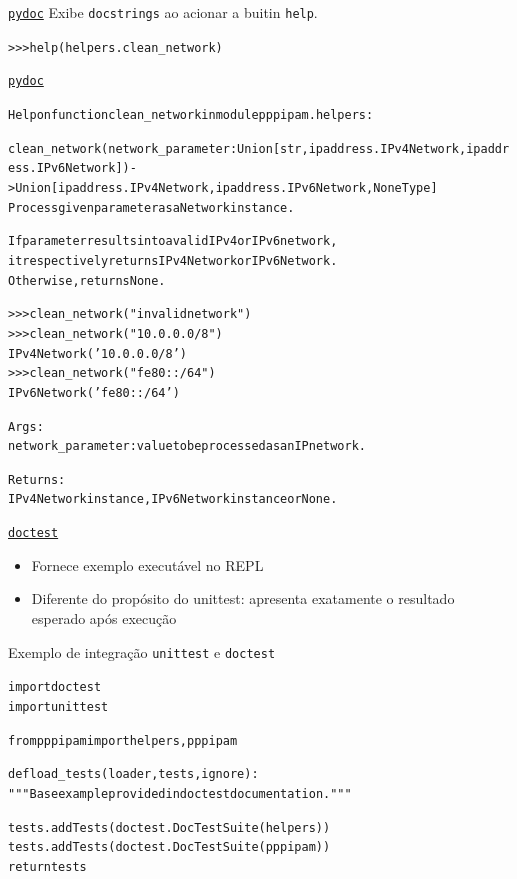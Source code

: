 \documentclass[11pt]{beamer}
\begin{document}
\begin{frame}[fragile]{\href{https://docs.python.org/3/library/pydoc.html}{\texttt{pydoc}}}
Exibe \texttt{docstrings} ao acionar a buitin \texttt{help}. 

\begin{alltt}
>>> help(helpers.clean_network)
\end{alltt}
\end{frame}


\begin{frame}[fragile]{\href{https://docs.python.org/3/library/pydoc.html}{\texttt{pydoc}}}
\begin{alltt}\tiny
Help on function clean_network in module pppipam.helpers:

clean_network(network_parameter: Union[str, ipaddress.IPv4Network, ipaddress.IPv6Network]) -> Union[ipaddress.IPv4Network, ipaddress.IPv6Network, NoneType]
    Process given parameter as a Network instance.

    If parameter results into a valid IPv4 or IPv6 network,
    it respectively returns IPv4Network or IPv6Network.
    Otherwise, returns None.

    >>> clean_network("invalid network")
    >>> clean_network("10.0.0.0/8")
    IPv4Network('10.0.0.0/8')
    >>> clean_network("fe80::/64")
    IPv6Network('fe80::/64')

    Args:
        network_parameter: value to be processed as an IP network.

    Returns:
        IPv4Network instance, IPv6Network instance or None.
\end{alltt}
\end{frame}

\begin{frame}[fragile]{\href{https://docs.python.org/3/library/doctest.html}{\texttt{doctest}}}
  \begin{itemize}
    \item Fornece exemplo executável no REPL
    \item Diferente do propósito do unittest: apresenta exatamente o resultado esperado após execução
  \end{itemize}
\end{frame}

\begin{frame}[fragile]{Exemplo de integração \texttt{unittest} e \texttt{doctest}}
\begin{alltt}\scriptsize
import doctest
import unittest

from pppipam import helpers, pppipam


def load_tests(loader, tests, ignore):
    """Base example provided in doctest documentation."""

    tests.addTests(doctest.DocTestSuite(helpers))
    tests.addTests(doctest.DocTestSuite(pppipam))
    return tests
\end{alltt}
\end{frame}
\end{document}
